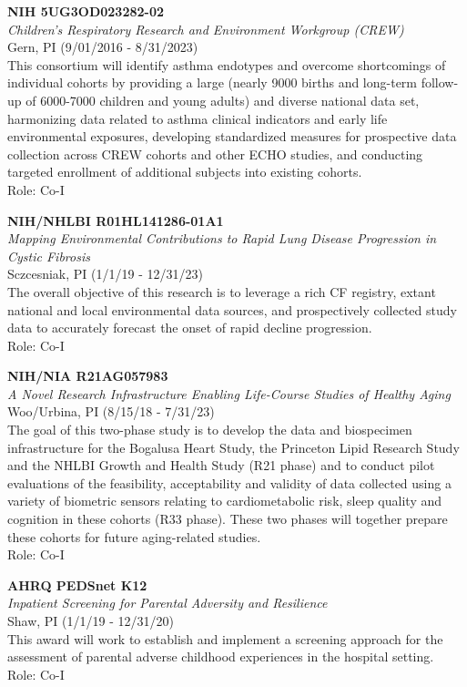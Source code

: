 \documentclass{nihbiosketch}
\begin{document}
\bigskip

\textbf{NIH 5UG3OD023282-02}\\
\emph{Children's Respiratory Research and Environment Workgroup
(CREW)}\\
Gern, PI (9/01/2016 - 8/31/2023)\\
This consortium will identify asthma endotypes and overcome shortcomings
of individual cohorts by providing a large (nearly 9000 births and
long-term follow-up of 6000-7000 children and young adults) and diverse
national data set, harmonizing data related to asthma clinical
indicators and early life environmental exposures, developing
standardized measures for prospective data collection across CREW
cohorts and other ECHO studies, and conducting targeted enrollment of
additional subjects into existing cohorts.\\
Role: Co-I

\bigskip

\textbf{NIH/NHLBI R01HL141286-01A1}\\
\emph{Mapping Environmental Contributions to Rapid Lung Disease
Progression in Cystic Fibrosis}\\
Sczcesniak, PI (1/1/19 - 12/31/23)\\
The overall objective of this research is to leverage a rich CF
registry, extant national and local environmental data sources, and
prospectively collected study data to accurately forecast the onset of
rapid decline progression.\\
Role: Co-I

\bigskip

\textbf{NIH/NIA R21AG057983}\\
\emph{A Novel Research Infrastructure Enabling Life-Course Studies of
Healthy Aging}\\
Woo/Urbina, PI (8/15/18 - 7/31/23)\\
The goal of this two-phase study is to develop the data and biospecimen
infrastructure for the Bogalusa Heart Study, the Princeton Lipid
Research Study and the NHLBI Growth and Health Study (R21 phase) and to
conduct pilot evaluations of the feasibility, acceptability and validity
of data collected using a variety of biometric sensors relating to
cardiometabolic risk, sleep quality and cognition in these cohorts (R33
phase). These two phases will together prepare these cohorts for future
aging-related studies.\\
Role: Co-I

\bigskip

\textbf{AHRQ PEDSnet K12}\\
\emph{Inpatient Screening for Parental Adversity and Resilience}\\
Shaw, PI (1/1/19 - 12/31/20)\\
This award will work to establish and implement a screening approach for
the assessment of parental adverse childhood experiences in the hospital
setting.\\
Role: Co-I
\end{document}
